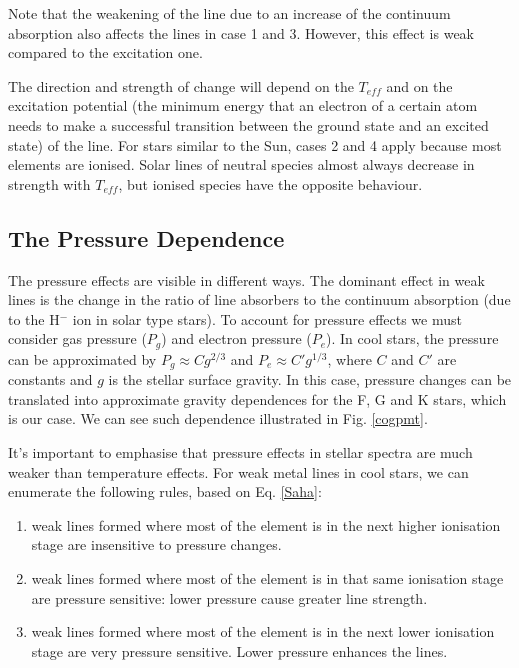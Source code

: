 \documentclass[dvips,12pt,a4paper]{report}
\begin{document}
{Note that the weakening of the line due to an increase of the continuum absorption also affects the lines in case 1 and 3. However, this effect is weak compared to the excitation one.

The direction and strength of change will depend on the $T_{eff}$ and on the excitation potential (the minimum energy that an electron of a certain atom needs to make a successful transition between the ground state and an excited state) of the line. For stars similar to the Sun, cases 2 and 4 apply because most elements are ionised. Solar lines of neutral species almost always decrease in strength with $T_{eff}$, but ionised species have the opposite behaviour.

\subsection{The Pressure Dependence}

The pressure effects are visible in different ways. The dominant effect in weak lines is the change in the ratio of line absorbers to the continuum absorption (due to the H$^-$ ion in solar type stars). To account for pressure effects we must consider gas pressure ($P_g$) and electron pressure ($P_e$). In cool stars, the pressure can be approximated by $P_g\approx C g^{2/3}$ and $P_e\approx C' g^{1/3}$, where $C$ and $C'$ are constants and $g$ is the stellar surface gravity. In this case, pressure changes can be translated into approximate gravity dependences for the F, G and K stars, which is our case. We can see such dependence illustrated in Fig. \ref{cogpmt}.

It's important to emphasise that pressure effects in stellar spectra are much weaker than temperature effects. For weak metal lines in cool stars, we can enumerate the following rules, based on Eq. \ref{Saha}:

\begin{enumerate}
 \item weak lines formed where most of the element is in the next higher ionisation stage are insensitive to pressure changes.
\item weak lines formed where most of the element is in that same ionisation stage are pressure sensitive: lower pressure cause greater line strength.
\item weak lines formed where most of the element is in the next lower ionisation stage are very pressure sensitive. Lower pressure enhances the lines.
\end{enumerate}

}
\end{document}
